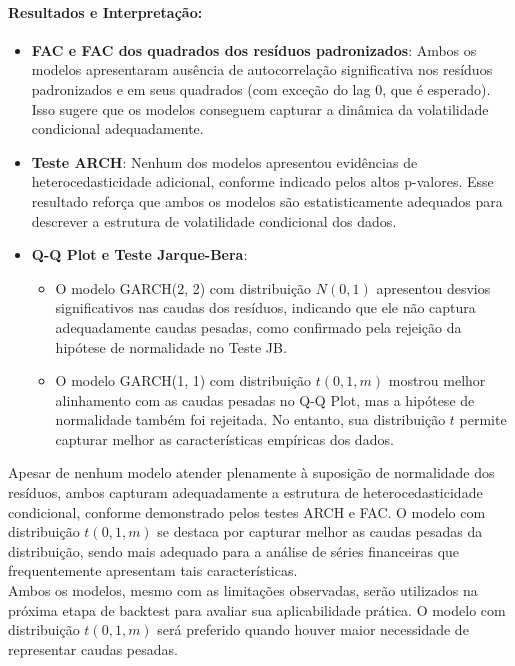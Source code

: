 \documentclass[a4paper, 12pt]{article}
\begin{document}
\paragraph{Resultados e Interpretação:}
\begin{itemize}
    \item \textbf{FAC e FAC dos quadrados dos resíduos padronizados}:
    Ambos os modelos apresentaram ausência de autocorrelação significativa nos resíduos padronizados e em seus quadrados (com exceção do lag 0, que é esperado). Isso sugere que os modelos conseguem capturar a dinâmica da volatilidade condicional adequadamente.

    \item \textbf{Teste ARCH}:
    Nenhum dos modelos apresentou evidências de heterocedasticidade adicional, conforme indicado pelos altos p-valores. Esse resultado reforça que ambos os modelos são estatisticamente adequados para descrever a estrutura de volatilidade condicional dos dados.

    \item \textbf{Q-Q Plot e Teste Jarque-Bera}:
    \begin{itemize}
        \item O modelo GARCH(2, 2) com distribuição \(N(0,1)\) apresentou desvios significativos nas caudas dos resíduos, indicando que ele não captura adequadamente caudas pesadas, como confirmado pela rejeição da hipótese de normalidade no Teste JB.
        \item O modelo GARCH(1, 1) com distribuição \(t(0,1,m)\) mostrou melhor alinhamento com as caudas pesadas no Q-Q Plot, mas a hipótese de normalidade também foi rejeitada. No entanto, sua distribuição \(t\) permite capturar melhor as características empíricas dos dados.
    \end{itemize}
\end{itemize}


Apesar de nenhum modelo atender plenamente à suposição de normalidade dos resíduos, ambos capturam adequadamente a estrutura de heterocedasticidade condicional, conforme demonstrado pelos testes ARCH e FAC. O modelo com distribuição \(t(0,1,m)\) se destaca por capturar melhor as caudas pesadas da distribuição, sendo mais adequado para a análise de séries financeiras que frequentemente apresentam tais características.\\

Ambos os modelos, mesmo com as limitações observadas, serão utilizados na próxima etapa de backtest para avaliar sua aplicabilidade prática. O modelo com distribuição \(t(0,1,m)\) será preferido quando houver maior necessidade de representar caudas pesadas.
\end{document}
